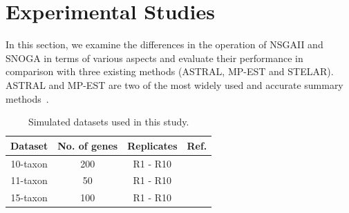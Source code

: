 \section{Experimental Studies}
\label{sec:experiment}
In this section, we examine the differences in the operation of NSGAII and SNOGA in terms of various aspects and evaluate their performance in comparison with three existing methods (ASTRAL, MP-EST and STELAR). ASTRAL and MP-EST are two of the most widely used and accurate summary methods~\cite{islam2019stelar}. 

\begin{table}[htbp]
	\centering
	\caption{Simulated datasets used in this study.}
	\begin{tabular}{|c|c|c|c|}
		\hline
		Dataset & \multicolumn{1}{l|}{No. of genes} & Replicates & \multicolumn{1}{l|}{Ref.} \\
		\hline
		10-taxon &   200    & R1 - R10 & \cite{bayzid2015weighted} \\
		\hline
		11-taxon &   50    & R1 - R10 & \cite{chung2011comparing} \\
		\hline
		15-taxon &   100    & R1 - R10 & \cite{statistical-binning} \\
		\hline
	\end{tabular}\label{tab:datasets}\end{table}

